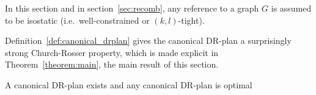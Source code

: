 In this section and in section~\ref{sec:recomb}, any reference to a graph $G$ is assumed to be isostatic (i.e.\ well-constrained or $(k,l)$-tight).




Definition~\ref{def:canonical_drplan} gives the canonical DR-plan a surprisingly strong Church-Rosser property, which is made explicit in Theorem~\ref{theorem:main}, the main result of this section.

\begin{theorem}
\label{theorem:canonical_exists_and_is_optimal}
\label{theorem:canonical_is_optimal}
\label{theorem:main}
    A canonical DR-plan exists  and any canonical DR-plan is optimal 
\end{theorem}






